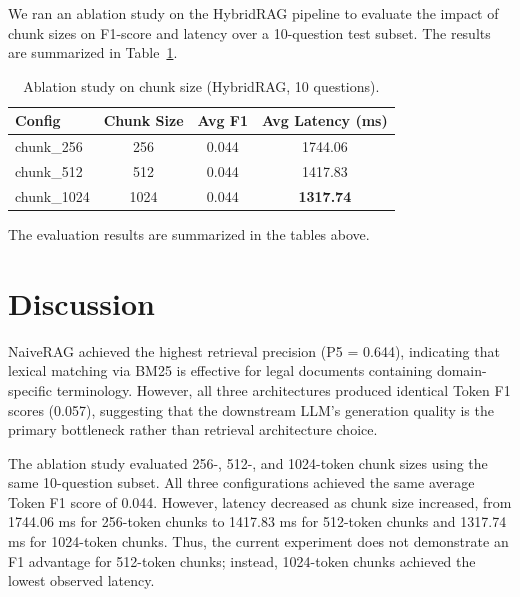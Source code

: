 \documentclass[11pt]{article}
\begin{document}
We ran an ablation study on the HybridRAG pipeline to evaluate the impact of chunk sizes on F1-score and latency over a 10-question test subset. The results are summarized in Table~\ref{tab:ablation}.

\begin{table}[ht]

\centering

\begin{tabular}{lccc}

\toprule

Config & Chunk Size & Avg F1 & Avg Latency (ms) \\

\midrule

chunk\_256 & 256 & 0.044 & 1744.06 \\

chunk\_512 & 512 & 0.044 & 1417.83 \\

chunk\_1024 & 1024 & 0.044 & \textbf{1317.74} \\

\bottomrule

\end{tabular}

\caption{Ablation study on chunk size (HybridRAG, 10 questions).}

\label{tab:ablation}

\end{table}

The evaluation results are summarized in the tables above.


\section{Discussion}

NaiveRAG achieved the highest retrieval precision (P\@5 = 0.644), indicating that lexical matching via BM25 is effective for legal documents containing domain-specific terminology. However, all three architectures produced identical Token F1 scores (0.057), suggesting that the downstream LLM's generation quality is the primary bottleneck rather than retrieval architecture choice.

The ablation study evaluated 256-, 512-, and 1024-token chunk sizes using the same 10-question subset. All three configurations achieved the same average Token F1 score of 0.044. However, latency decreased as chunk size increased, from 1744.06 ms for 256-token chunks to 1417.83 ms for 512-token chunks and 1317.74 ms for 1024-token chunks. Thus, the current experiment does not demonstrate an F1 advantage for 512-token chunks; instead, 1024-token chunks achieved the lowest observed latency.
\end{document}
